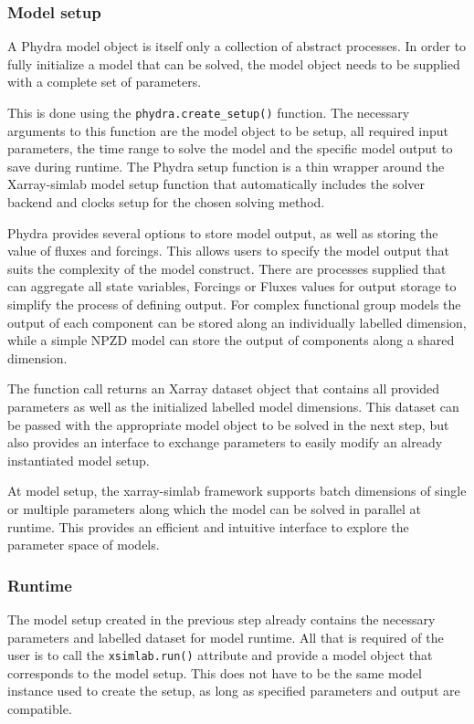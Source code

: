 \documentclass[journal abbreviations, manuscript]{copernicus}
\begin{document}
\subsubsection{Model setup}

A Phydra model object is itself only a collection of abstract processes. In order to fully initialize a model that can be solved, the model object needs to be supplied with a complete set of parameters.

This is done using the \texttt{phydra.create\_setup()} function. The necessary arguments to this function are the model object to be setup, all required input parameters, the time range to solve the model and the specific model output to save during runtime. The Phydra setup function is a thin wrapper around the Xarray-simlab model setup function that automatically includes the solver backend and clocks setup for the chosen solving method.

Phydra provides several options to store model output, as well as storing the value of fluxes and forcings. This allows users to specify the model output that suits the complexity of the model construct. There are processes supplied that can aggregate all state variables, Forcings or Fluxes values for output storage to simplify the process of defining output. For complex functional group models the output of each component can be stored along an individually labelled dimension, while a simple NPZD model can store the output of components along a shared dimension.

The function call returns an Xarray dataset object that contains all provided parameters as well as the initialized labelled model dimensions. This dataset can be passed with the appropriate model object to be solved in the next step, but also provides an interface to exchange parameters to easily modify an already instantiated model setup.

At model setup, the xarray-simlab framework supports batch dimensions of single or multiple parameters along which the model can be solved in parallel at runtime. This provides an efficient and intuitive interface to explore the parameter space of models.

\subsubsection{Runtime}
The model setup created in the previous step already contains the necessary parameters and labelled dataset for model runtime. All that is required of the user is to call the \texttt{xsimlab.run()} attribute and provide a model object that corresponds to the model setup. This does not have to be the same model instance used to create the setup, as long as specified parameters and output are compatible.
\end{document}
